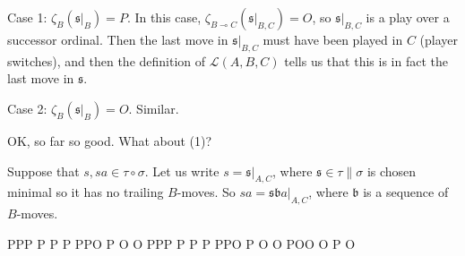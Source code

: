 \documentclass[11pt]{article} %
\theoremstyle{plain} %
\theoremstyle{definition} %
\theoremstyle{exercisestyle}
\renewcommand{\implies}{\multimap}
\newcommand{\comp}[2]{#1 \circ #2}
\renewcommand{\L}{\mathcal L}
\newcommand{\s}{\mathfrak s}
\begin{document}
Case 1: $\zeta_B(\s\vert_B)=P$.  In this case, $\zeta_{B\implies C}(\s\vert_{B,C})=O$, so $\s\vert_{B,C}$ is a play over a successor ordinal.  Then the last move in $\s\vert_{B,C}$ must have been played in $C$ (player switches), and then the definition of $\L(A,B,C)$ tells us that this is in fact the last move in $\s$.

Case 2: $\zeta_B(\s\vert_B)=O$.  Similar.

OK, so far so good.  What about (1)?

Suppose that $s,sa\in\comp\tau\sigma$.  Let us write $s=\s\vert_{A,C}$, where $\s\in\tau\|\sigma$ is chosen minimal so it has no trailing $B$-moves.  So $sa=\s \mathfrak b a\vert_{A,C}$, where $\mathfrak b$ is a sequence of $B$-moves.

PPP P P P
PPO P O O
PPP P P P
PPO P O O
POO O P O
\end{document}
